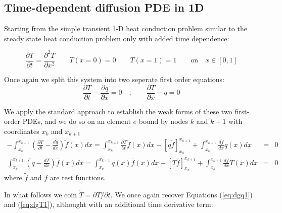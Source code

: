 \newpage
\subsection{Time-dependent diffusion PDE in 1D}

Starting from the simple transient 1-D heat conduction problem similar to the 
steady state heat conduction problem only with added time dependence:

\begin{equation}
\frac{\partial T}{\partial t}=\frac{\partial^2T}{\partial x^2} \qquad T(x=0)=0 \qquad T(x=1)=1 \qquad \text{on} \quad x\in[0,1]
\end{equation}


Once again we split this system into two seperate first order equations:
\begin{equation}
\frac{\partial T}{\partial t}-\frac{\partial q}{\partial x}=0 \quad;\qquad \frac{\partial T}{\partial x} -q =0
\end{equation}

We apply the standard approach to establish the weak forms of these two first-order PDEs, and we do so 
on an element $e$ bound by nodes $k$ and $k+1$ with coordinates $x_k$ and $x_{k+1}$
\begin{eqnarray}
-\int_{x_k}^{x_{k+1}} \left( \frac{\partial T}{\partial t}- \frac{dq}{dx} \right) \tilde{f}(x) dx =
\int_{x_k}^{x_{k+1}} \frac{\partial T}{\partial t} \tilde{f}(x)dx
 -\left[q \tilde{f} \right]_{x_k}^{x_{k+1}} 
+ \int_{x_k}^{x_{k+1}} \frac{d\tilde{f}}{dx} q(x) dx &=& 0
\label{eq:dg1}\\
\int_{x_k}^{x_{k+1}}  \left( q-\frac{dT}{dx} \right) \overline{f}(x) dx
=
\int_{x_k}^{x_{k+1}}  q(x) \overline{f}(x) dx
-\left[ T \overline{f}  \right]_{x_k}^{x_{k+1}} + \int_{x_k}^{x_{k+1}} \frac{d\overline{f}}{dx} T(x) dx 
&=& 0
\label{eq:dg2}
\end{eqnarray}
where $\tilde{f}$ and $\overline{f}$ are test functions.


In what follows we coin $\dot{T}=\partial T/\partial t$. 
We once again recover Equations (\ref{eq:dgq1}) and (\ref{eq:dgT1}), althought with 
an additional time derivative term: 


